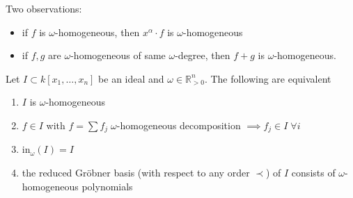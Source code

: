 \documentclass[a4paper, 11pt]{article}
\begin{document}
\begin{remark}
  Two observations:
  \begin{itemize}
    \item if \( f \) is \( \omega \)-homogeneous, then \( x^\alpha \cdot f \) is \( \omega \)-homogeneous
    \item if \( f,g \) are \( \omega \)-homogeneous of same \( \omega \)-degree, then \( f + g \) is \( \omega \)-homogeneous.
  \end{itemize}
\end{remark}

\begin{mdframed}
\begin{prop}
  Let \( I \subset k[x_1, \dots, x_n] \) be an ideal and \( \omega \in \mathbb R^n_{>0} \). The following are equivalent 
  \begin{enumerate}
    \item \( I \) is \( \omega \)-homogeneous
    \item \( f \in I \) with \(f = \sum f_j \; \omega \)-homogeneous decomposition \( \implies f_j \in I \; \forall i\) 
    \item \( \mathrm{in}_\omega (I) = I \)
    \item the reduced Gröbner basis (with respect to any order \( \prec \)) of \( I \) consists of \( \omega \)-homogeneous polynomials
  \end{enumerate}
\end{prop}
\end{mdframed}
\end{document}

